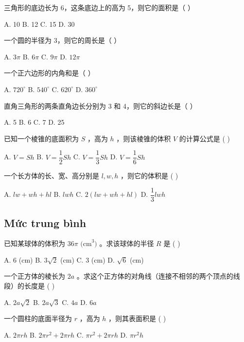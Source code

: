 \documentclass[11pt, a4paper]{article}
\begin{document}
\begin{baitap}[1]
三角形的底边长为 6，这条底边上的高为 5，则它的面积是（ ）
\par\vspace{3pt}
\noindent A. 10 \quad B. 12 \quad C. 15 \quad D. 30
\end{baitap}
\begin{baitap}[2]
一个圆的半径为 3，则它的周长是（ ）
\par\vspace{3pt}
\noindent A. $3\pi$ \quad B. $6\pi$ \quad C. $9\pi$ \quad D. $12\pi$
\end{baitap}
\begin{baitap}[3]
一个正六边形的内角和是（ ）
\par\vspace{3pt}
\noindent A. $720^\circ$ \quad B. $540^\circ$ \quad C. $620^\circ$ \quad D. $360^\circ$
\end{baitap}
\begin{baitap}[4]
直角三角形的两条直角边长分别为 3 和 4，则它的斜边长是（ ）
\par\vspace{3pt}
\noindent A. 5 \quad B. 6 \quad C. 7 \quad D. 25
\end{baitap}
\begin{baitap}[5]
已知一个棱锥的底面积为 $S$ ，高为 $h$ ，则该棱锥的体积 $V$ 的计算公式是 ( )
\par\vspace{3pt}
\noindent A. $V = Sh$ \quad B. $V = \dfrac{1}{2}Sh$ \quad C. $V = \dfrac{1}{3}Sh$ \quad D. $V = \dfrac{1}{6}Sh$
\end{baitap}
\begin{baitap}[6]
一个长方体的长、宽、高分别是 $l, w, h$ ，则它的体积是 ( )
\par\vspace{3pt}
\noindent A. $lw + wh + hl$ \quad B. $lwh$ \quad C. $2(lw + wh + hl)$ \quad D. $\dfrac{1}{3}lwh$
\end{baitap}
\subsection{Mức trung bình}

\begin{baitap}[7]
已知某球体的体积为 $36\pi \text{ (cm}^3\text{)}$ 。求该球体的半径 $R$ 是 ( )
\par\vspace{3pt}
\noindent A. 6 (cm) \quad B. $3\sqrt{2}$ (cm) \quad C. 3 (cm) \quad D. $\sqrt{6}$ (cm)
\end{baitap}
\begin{baitap}[8]
一个正方体的棱长为 $2a$ 。求这个正方体的对角线（连接不相邻的两个顶点的线段）的长度是 ( )
\par\vspace{3pt}
\noindent A. $2a\sqrt{2}$ \quad B. $2a\sqrt{3}$ \quad C. $4a$ \quad D. $6a$
\end{baitap}
\begin{baitap}[9]
一个圆柱的底面半径为 $r$ ，高为 $h$ ，则其表面积是 ( )
\par\vspace{3pt}
\noindent A. $2\pi rh$ \quad B. $2\pi r^2 + 2\pi rh$ \quad C. $\pi r^2 + 2\pi rh$ \quad D. $\pi r^2 h$
\end{baitap}
\end{document}

